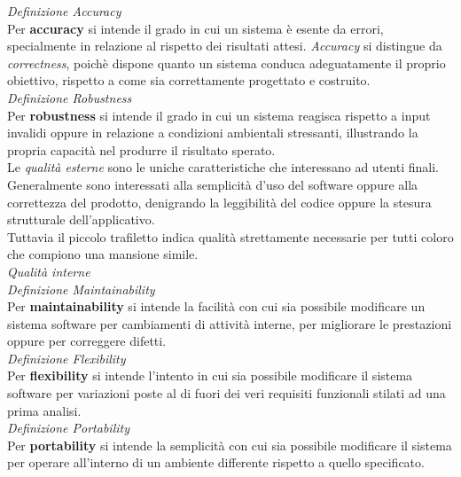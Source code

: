 \documentclass{article}
\begin{document}
\textit{Definizione Accuracy}\\
Per \textbf{accuracy} si intende il grado in cui un sistema è esente da errori, specialmente in relazione al rispetto dei risultati attesi. \textit{Accuracy} si distingue da \textit{correctness}, poichè dispone quanto un sistema conduca adeguatamente il proprio obiettivo, rispetto a come sia correttamente progettato e costruito.\vspace*{14pt}\\
\textit{Definizione Robustness}\\
Per \textbf{robustness} si intende il grado in cui un sistema reagisca rispetto a input invalidi oppure in relazione a condizioni ambientali stressanti, illustrando la propria capacità nel produrre il risultato sperato.\vspace*{14pt}\\
Le \textit{qualità esterne} sono le uniche caratteristiche che interessano ad utenti finali. Generalmente sono interessati alla semplicità d'uso del software oppure alla correttezza del prodotto, denigrando la leggibilità del codice oppure la stesura strutturale dell'applicativo.\vspace*{14pt}\\
Tuttavia il piccolo trafiletto indica qualità strettamente necessarie per tutti coloro che compiono una mansione simile.\vspace*{14pt}\\
\textit{Qualità interne}\\
\textit{Definizione Maintainability}\\
Per \textbf{maintainability} si intende la facilità con cui sia possibile modificare un sistema software per cambiamenti di attività interne, per migliorare le prestazioni oppure per correggere difetti.\vspace*{14pt}\\
\textit{Definizione Flexibility}\\
Per \textbf{flexibility} si intende l'intento in cui sia possibile modificare il sistema software per variazioni poste al di fuori dei veri requisiti funzionali stilati ad una prima analisi.\vspace*{14pt}\\
\textit{Definizione Portability}\\
Per \textbf{portability} si intende la semplicità con cui sia possibile modificare il sistema per operare all'interno di un ambiente differente rispetto a quello specificato.\vspace*{14pt}\\
\end{document}
